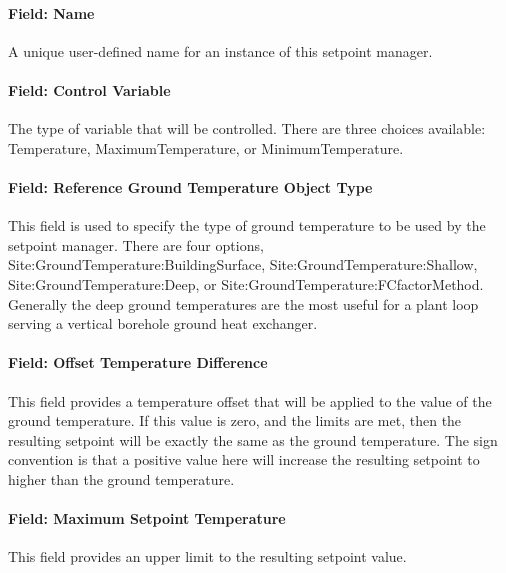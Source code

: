 \paragraph{Field: Name}\label{field-name-22-002}

A unique user-defined name for an instance of this setpoint manager.

\paragraph{Field: Control Variable}\label{field-control-variable-16}

The type of variable that will be controlled. There are three choices available: Temperature, MaximumTemperature, or MinimumTemperature.

\paragraph{Field: Reference Ground Temperature Object Type}\label{field-reference-ground-temperature-object-type}

This field is used to specify the type of ground temperature to be used by the setpoint manager. There are four options, Site:GroundTemperature:BuildingSurface, Site:GroundTemperature:Shallow, Site:GroundTemperature:Deep, or Site:GroundTemperature:FCfactorMethod. Generally the deep ground temperatures are the most useful for a plant loop serving a vertical borehole ground heat exchanger.

\paragraph{Field: Offset Temperature Difference}\label{field-offset-temperature-difference-2}

This field provides a temperature offset that will be applied to the value of the ground temperature. If this value is zero, and the limits are met, then the resulting setpoint will be exactly the same as the ground temperature. The sign convention is that a positive value here will increase the resulting setpoint to higher than the ground temperature.

\paragraph{Field: Maximum Setpoint Temperature}\label{field-maximum-setpoint-temperature-7}

This field provides an upper limit to the resulting setpoint value.


